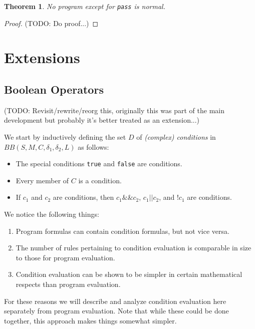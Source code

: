 \documentclass[11pt]{article}
\begin{document}
\newtheorem*{passisuniquelynormal}{Theorem}
\begin{passisuniquelynormal}
No program except for \texttt{pass} is normal.
\end{passisuniquelynormal}

\begin{proof}
(TODO: Do proof...)
\end{proof}

\section{Extensions}

\subsection{Boolean Operators}

(TODO: Revisit/rewrite/reorg this, originally this was part of the main development but probably it's better treated as an extension...)

We start by inductively defining the set $D$ of \emph{(complex) conditions} in $BB(S, M, C, \delta_{1}, \delta_{2}, L)$ as follows:

\begin{itemize}
\item The special conditions \texttt{true} and \texttt{false} are conditions.
\item Every member of $C$ is a condition.
\item If $c_{1}$ and $c_{2}$ are conditions, then $c_{1} \texttt{\&\&} c_{2}$, $c_{1} \texttt{||} c_{2}$, and $\texttt{!} c_{1}$ are conditions.
\end{itemize}

We notice the following things:
\begin{enumerate}
\item Program formulas can contain condition formulas, but not vice versa.
\item The number of rules pertaining to condition evaluation is comparable in size to those for program evaluation.
\item Condition evaluation can be shown to be simpler in certain mathematical respects than program evaluation.
\end{enumerate}

For these reasons we will describe and analyze condition evaluation here separately from program evaluation.  Note that while these could be done together, this approach makes things somewhat simpler.
\end{document}
